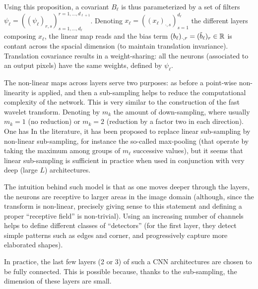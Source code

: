Using this proposition, a covariant $B_\ell$  is thus parameterized by a set of filters $\psi_\ell = ( (\psi_\ell)_{r,s} )_{s=1,\ldots,d_{\ell}}^{r=1,\ldots,d_{\ell+1}}$. Denoting $x_\ell = ( (x_{\ell})_{\cdot,s} )_{s=1}^{d_\ell}$ the different layers composing $x_\ell$, the linear map reads
and the bias term $(b_\ell)_{\cdot,r} = (\tilde b_\ell)_r \in \mathbb{R}$ is contant across the spacial dimension (to maintain translation invariance).
%
Translation covariance results in a weight-sharing: all the neurons (associated to an output pixels) have the same weights, defined by $\psi_\ell$. 

The non-linear maps across layers serve two purposes: as before a point-wise non-linearity is applied, and then a sub-sampling helps to reduce the computational complexity of the network. This is very similar to the construction of the fast wavelet transform. Denoting by $m_k$ the amount of down-sampling, where usually $m_k=1$ (no reduction) or $m_k=2$ (reduction by a factor two in each direction). One has
In the literature, it has been proposed to replace linear sub-sampling by non-linear sub-sampling, for instance the so-called max-pooling (that operate by taking the maximum among groups of $m_\ell$ successive values), but it seems that linear sub-sampling is sufficient in practice when used in conjunction with very deep (large $L$) architectures. 

The intuition behind such model is that as one moves deeper through the layers, the neurons are receptive to larger areas in the image domain (although, since the transform is non-linear, precisely giving sense to this statement and defining a proper ``receptive field'' is non-trivial). Using an increasing number of channels helps to define different classes of ``detectors'' (for the first layer, they detect simple patterns such as edges and corner, and progressively capture more elaborated shapes).

In practice, the last few layers (2 or 3) of such a CNN architectures are chosen to be fully connected. This is possible because, thanks to the sub-sampling, the dimension of these layers are small.  

